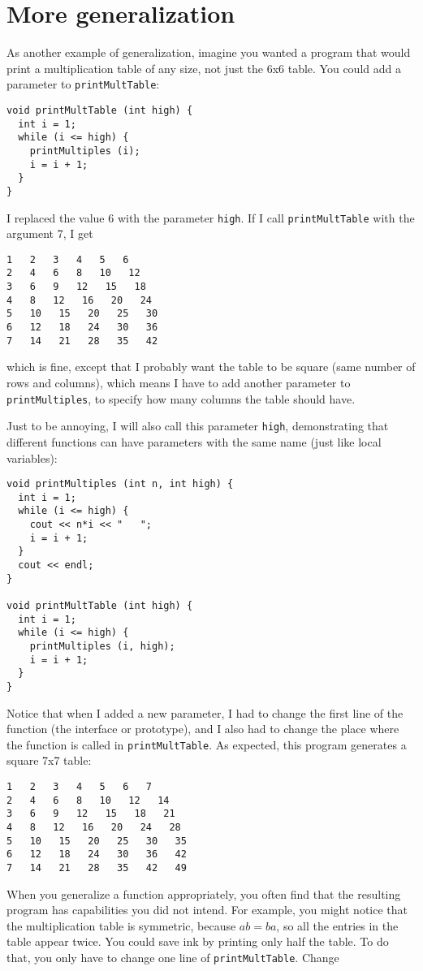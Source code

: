 
\section{More generalization}

As another example of generalization, imagine you wanted
a program that would print a multiplication table of any
size, not just the 6x6 table.  You could add a parameter to
{\tt printMultTable}:

\begin{lstlisting}
void printMultTable (int high) {
  int i = 1;
  while (i <= high) {
    printMultiples (i);
    i = i + 1;
  }
}
\end{lstlisting}
%
I replaced the value 6 with the parameter {\tt high}.  If I
call {\tt printMultTable} with the argument 7, I get

\begin{lstlisting}
1   2   3   4   5   6   
2   4   6   8   10   12   
3   6   9   12   15   18   
4   8   12   16   20   24   
5   10   15   20   25   30   
6   12   18   24   30   36   
7   14   21   28   35   42   
\end{lstlisting}
%
which is fine, except that I probably want the table to
be square (same number of rows and columns), which means
I have to add another parameter to {\tt printMultiples},
to specify how many columns the table should have.

Just to be annoying, I will also call this parameter {\tt high},
demonstrating that different functions can have parameters
with the same name (just like local variables):

\begin{lstlisting}
void printMultiples (int n, int high) {
  int i = 1;
  while (i <= high) {
    cout << n*i << "   ";
    i = i + 1;
  }    
  cout << endl;
}

void printMultTable (int high) {
  int i = 1;
  while (i <= high) {
    printMultiples (i, high);
    i = i + 1;
  }
}
\end{lstlisting}
%
Notice that when I added a new parameter, I had to change the first
line of the function (the interface or prototype), and I also had to
change the place where the function is called in {\tt printMultTable}.
As expected, this program generates a square 7x7 table:

\begin{lstlisting}
1   2   3   4   5   6   7   
2   4   6   8   10   12   14   
3   6   9   12   15   18   21   
4   8   12   16   20   24   28   
5   10   15   20   25   30   35   
6   12   18   24   30   36   42   
7   14   21   28   35   42   49
\end{lstlisting}
%
When you generalize a function appropriately, you often find
that the resulting program has capabilities you did not intend.
For example, you might notice that the multiplication table
is symmetric, because $ab = ba$, so all the entries in the
table appear twice.  You could save ink by printing only
half the table.  To do that, you only have to change one
line of {\tt printMultTable}.  Change

